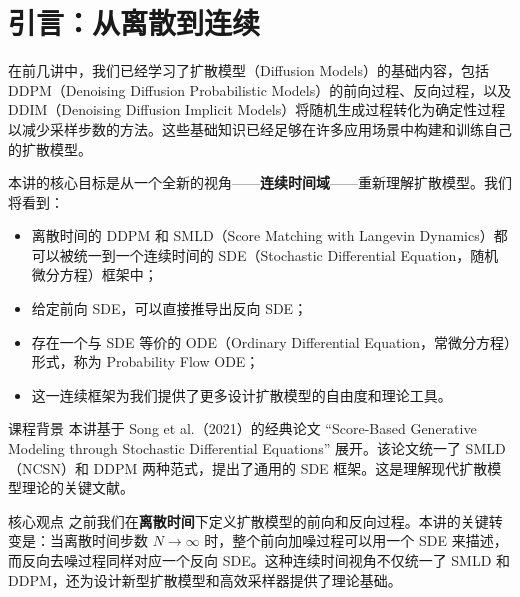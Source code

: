 \section{引言：从离散到连续}

在前几讲中，我们已经学习了扩散模型（Diffusion Models）的基础内容，包括 DDPM（Denoising Diffusion Probabilistic Models）的前向过程、反向过程，以及 DDIM（Denoising Diffusion Implicit Models）将随机生成过程转化为确定性过程以减少采样步数的方法。这些基础知识已经足够在许多应用场景中构建和训练自己的扩散模型。

本讲的核心目标是从一个全新的视角——\textbf{连续时间域}——重新理解扩散模型。我们将看到：

\begin{itemize}
    \item 离散时间的 DDPM 和 SMLD（Score Matching with Langevin Dynamics）都可以被统一到一个连续时间的 SDE（Stochastic Differential Equation，随机微分方程）框架中；
    \item 给定前向 SDE，可以直接推导出反向 SDE；
    \item 存在一个与 SDE 等价的 ODE（Ordinary Differential Equation，常微分方程）形式，称为 Probability Flow ODE；
    \item 这一连续框架为我们提供了更多设计扩散模型的自由度和理论工具。
\end{itemize}

\begin{knowledgebox}{课程背景}
本讲基于 Song et al.（2021）的经典论文 ``Score-Based Generative Modeling through Stochastic Differential Equations'' 展开。该论文统一了 SMLD（NCSN）和 DDPM 两种范式，提出了通用的 SDE 框架。这是理解现代扩散模型理论的关键文献。
\end{knowledgebox}

\begin{importantbox}{核心观点}
之前我们在\textbf{离散时间}下定义扩散模型的前向和反向过程。本讲的关键转变是：当离散时间步数 $N \to \infty$ 时，整个前向加噪过程可以用一个 SDE 来描述，而反向去噪过程同样对应一个反向 SDE。这种连续时间视角不仅统一了 SMLD 和 DDPM，还为设计新型扩散模型和高效采样器提供了理论基础。
\end{importantbox}


